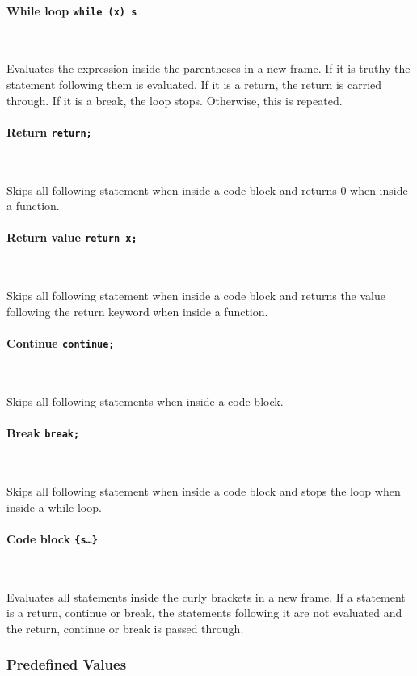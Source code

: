 \paragraph{While loop \quad \texttt{while (x) s}} \

Evaluates the expression inside the parentheses in a new frame. If it is truthy the statement following them is evaluated. If it is a return, the return is carried through. If it is a break, the loop stops. Otherwise, this is repeated.

\paragraph{Return \quad \texttt{return;}} \

Skips all following statement when inside a code block and returns 0 when inside a function.

\paragraph{Return value \quad \texttt{return x;}} \

Skips all following statement when inside a code block and returns the value following the return keyword when inside a function.

\paragraph{Continue \quad \texttt{continue;}} \

Skips all following statements when inside a code block.

\paragraph{Break \quad \texttt{break;}} \

Skips all following statement when inside a code block and stops the loop when inside a while loop.

\paragraph{Code block \quad \texttt{\{s\ldots\}}} \

Evaluates all statements inside the curly brackets in a new frame. If a statement is a return, continue or break, the statements following it are not evaluated and the return, continue or break is passed through.

\subsubsection{Predefined Values}

